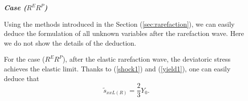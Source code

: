 \documentclass{article}
\numberwithin{equation}{section}
\numberwithin{table}{section}
\begin{document}


	\emph{\textbf{Case ($R^{E}R^{P}$)}}

Using the methods introduced in  the Section (\ref{sec:rarefaction}), we can easily deduce the formulation of all unknown variables after the rarefaction wave. Here we do not show the details of the  deduction.


For the case ($R^{E}R^{P}$),  after the elastic rarefaction wave, the deviatoric stress achieves the elastic limit. Thanks to (\ref{shock1}) and (\ref{yield1}), one can easily deduce that
\begin{equation*}
\tilde{s}_{xxL(R)} = \frac{2}{3}Y_0.
\end{equation*}
\end{document}

